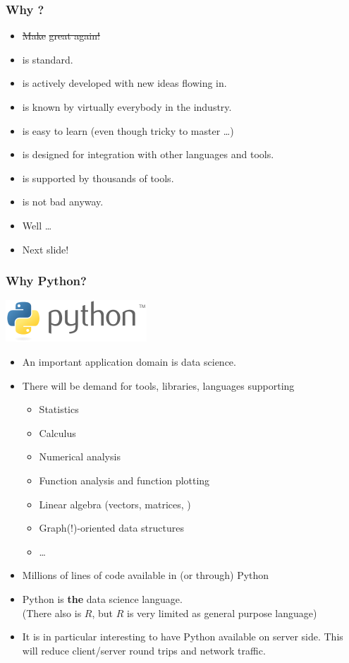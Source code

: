 \documentclass[mathserif,usenames,dvipsnames]{beamer}
\begin{document}
\begin{frame}
\frametitle{Why ?}
\begin{itemize}
\item \st{Make }\st{ great again!}
\item {} is standard.
\item {} is actively developed with new ideas flowing in.
\item {} is known by virtually everybody in the industry.
\item {} is easy to learn (even though tricky to master \dots)
\item {} is designed for integration with other languages and tools.
\item {} is supported by thousands of tools.
\item {} is not bad anyway.
\item Well \dots
\item Next slide!
\end{itemize}
\end{frame}

\begin{frame}[shrink]
\frametitle{Why Python?}
\includegraphics[width=0.2\linewidth]{pythonlogo.png}
\begin{itemize}
\item An important application domain is data science.
\item There will be demand for tools, libraries, languages supporting
\begin{itemize}
\item Statistics
\item Calculus
\item Numerical analysis
\item Function analysis and function plotting
\item Linear algebra (vectors, matrices, \etc)
\item Graph(!)-oriented data structures
\item \dots
\end{itemize}
\item Millions of lines of code available in (or through) Python
\item Python is \textbf{the} data science language.\\
      (There also is $R$, but $R$ is very limited as general purpose language)
\item It is in particular interesting to have Python available
      on server side.
      This will reduce client/server round trips
      and network traffic.
\end{itemize}
\end{frame}
\end{document}
